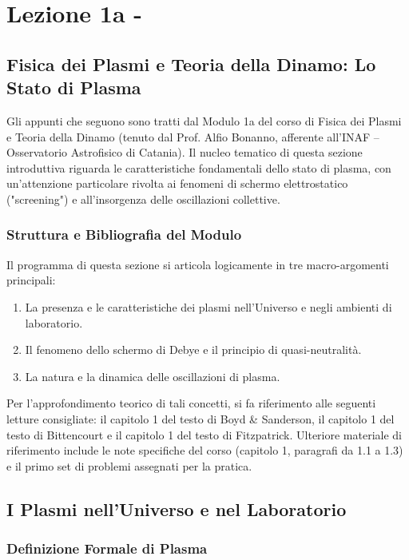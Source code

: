 \chapter{Lezione 1a - }

\section{Fisica dei Plasmi e Teoria della Dinamo: Lo Stato di Plasma}

Gli appunti che seguono sono tratti dal Modulo 1a del corso di Fisica dei Plasmi e Teoria della Dinamo (tenuto dal Prof. Alfio Bonanno, afferente all'INAF – Osservatorio Astrofisico di Catania). Il nucleo tematico di questa sezione introduttiva riguarda le caratteristiche fondamentali dello stato di plasma, con un'attenzione particolare rivolta ai fenomeni di schermo elettrostatico ("screening") e all'insorgenza delle oscillazioni collettive.

\subsection{Struttura e Bibliografia del Modulo}

Il programma di questa sezione si articola logicamente in tre macro-argomenti principali:
\begin{enumerate}
\item La presenza e le caratteristiche dei plasmi nell'Universo e negli ambienti di laboratorio.
\item Il fenomeno dello schermo di Debye e il principio di quasi-neutralità.
\item La natura e la dinamica delle oscillazioni di plasma.
\end{enumerate}

Per l'approfondimento teorico di tali concetti, si fa riferimento alle seguenti letture consigliate: il capitolo 1 del testo di Boyd \& Sanderson, il capitolo 1 del testo di Bittencourt e il capitolo 1 del testo di Fitzpatrick. Ulteriore materiale di riferimento include le note specifiche del corso (capitolo 1, paragrafi da 1.1 a 1.3) e il primo set di problemi assegnati per la pratica.

\section{I Plasmi nell'Universo e nel Laboratorio}

\subsection{Definizione Formale di Plasma}

